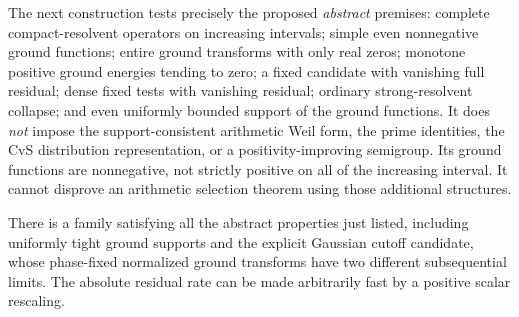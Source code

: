 The next construction tests precisely the proposed \emph{abstract}
premises: complete compact-resolvent operators on increasing intervals;
simple even nonnegative ground functions; entire ground transforms with only real
zeros; monotone positive ground energies tending to zero; a fixed
candidate with vanishing full residual; dense fixed tests with vanishing
residual; ordinary strong-resolvent collapse; and even uniformly bounded
support of the ground functions. It does \emph{not} impose the
support-consistent arithmetic Weil form, the prime identities, the
CvS distribution representation, or a positivity-improving semigroup.
Its ground functions are nonnegative, not strictly positive on all of
the increasing interval. It cannot disprove an arithmetic
selection theorem using those additional structures.

\begin{proposition}
\label{prop:ns43-ccm-nonselection}
There is a family satisfying all the abstract properties just listed,
including uniformly tight ground supports and the explicit Gaussian
cutoff candidate, whose phase-fixed normalized ground transforms have
two different subsequential limits. The absolute residual rate can be
made arbitrarily fast by a positive scalar rescaling.
\end{proposition}
